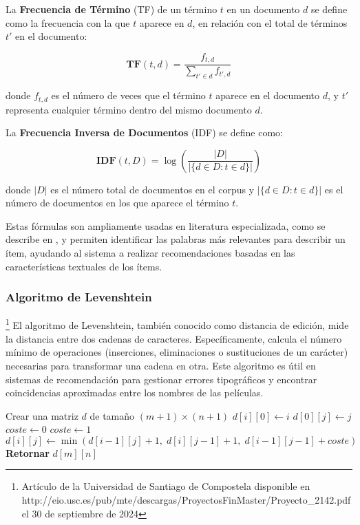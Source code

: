 \documentclass{llncs}
\begin{document}
La \textbf{Frecuencia de Término} (TF) de un término \( t \) en un documento \( d \) se define como la frecuencia con la que \( t \) aparece en \( d \), en relación con el total de términos \( t' \) en el documento:

\[
\mathbf{TF}(t, d) = \frac{f_{t,d}}{\sum_{t' \in d} f_{t',d}}
\]

donde \( f_{t,d} \) es el número de veces que el término \( t \) aparece en el documento \( d \), y \( t' \) representa cualquier término dentro del mismo documento \( d \). 

La \textbf{Frecuencia Inversa de Documentos} (IDF) se define como:

\[
\mathbf{IDF}(t, D) = \log \left( \frac{|D|}{| \{d \in D : t \in d \} |} \right)
\]

donde \( |D| \) es el número total de documentos en el corpus y \( | \{ d \in D : t \in d \} | \) es el número de documentos en los que aparece el término \( t \).

Estas fórmulas son ampliamente usadas en literatura especializada, como se describe en \cite{Referencia}, y permiten identificar las palabras más relevantes para describir un ítem, ayudando al sistema a realizar recomendaciones basadas en las características textuales de los ítems.


	
	\subsubsection{Algoritmo de Levenshtein}\footnote{Art\'iculo de la Universidad de Santiago de Compostela disponible en http://eio.usc.es/pub/mte/descargas/ProyectosFinMaster/Proyecto\_2142.pdf el 30 de septiembre de 2024}
	El algoritmo de Levenshtein, también conocido como distancia de edición, mide la distancia entre dos cadenas de caracteres. Específicamente, calcula el número mínimo de operaciones (inserciones, eliminaciones o sustituciones de un carácter) necesarias para transformar una cadena en otra. Este algoritmo es útil en sistemas de recomendación para gestionar errores tipográficos y encontrar coincidencias aproximadas entre los nombres de las películas.
	
\begin{algorithm}
	\begin{algorithmic}
		\STATE Crear una matriz $d$ de tamaño $(m+1) \times (n+1)$
		\STATE $d[i][0] \gets i$
		\ENDFOR
		\STATE $d[0][j] \gets j$
		\ENDFOR
		\STATE $coste \gets 0$
		\ELSE
		\STATE $coste \gets 1$
		\ENDIF
		\STATE $d[i][j] \gets \min(d[i-1][j] + 1, \; d[i][j-1] + 1, \; d[i-1][j-1] + coste)$
		\ENDFOR
		\ENDFOR
		\STATE \textbf{Retornar} $d[m][n]$
	\end{algorithmic}
\end{algorithm}
	
\end{document}
